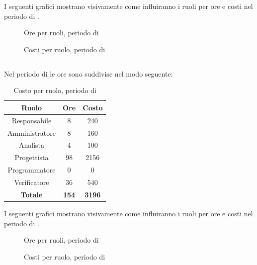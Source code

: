 I seguenti grafici mostrano visivamente come influiranno i ruoli per ore e costi nel periodo di \PA.
\begin{figure}[H]
	\centering
	\caption{Ore per ruoli, periodo di \PA}
\end{figure}
\begin{figure}[H]
	\centering
	\caption{Costi per ruolo, periodo di \PA}
\end{figure}

\subsection{\PD}
Nel periodo di \PD{} le ore sono suddivise nel modo seguente:
\begin{table}[H]
	\centering
	\begin{tabular}{|c|c|c|}
		\hline
		\textbf{Ruolo} &
		\textbf{Ore} &
		\textbf{Costo} \\
		\hline
		Responsabile & 8 & 240 \\
		\hline
		Amministratore & 8 & 160 \\
		\hline
		Analista & 4 & 100\\
		\hline
		Progettista & 98 & 2156 \\
		\hline
		Programmatore & 0 & 0 \\
		\hline
		Verificatore & 36 & 540 \\
		\hline
		\textbf{Totale} & \textbf{154} & \textbf{3196} \\
		\hline
	\end{tabular}
	\caption{Costo per ruolo, periodo di \PD}
\end{table}

I seguenti grafici mostrano visivamente come influiranno i ruoli per ore e costi nel periodo di \PD{}.
\begin{figure}[H]
	\centering
	\caption{Ore per ruoli, periodo di \PD}
\end{figure}
\begin{figure}[H]
	\centering
	\caption{Costi per ruolo, periodo di \PD}
\end{figure}

